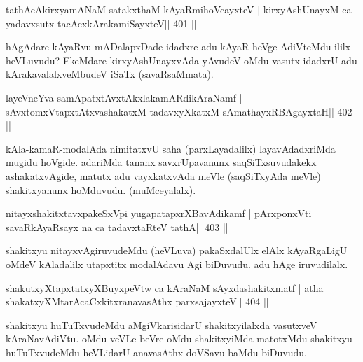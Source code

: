 
\begin{shl}
tathAcAkirxyamANaM satakxthaM kAyaRmihoVcayxteV |
kirxyAshUnayxM ca yadavxsutx tacAcxkArakamiSayxteV\hfill || 401 ||
\end{shl}

\begin{artha}
hAgAdare kAyaRvu mADalapxDade idadxre adu kAyaR heVge AdiVteMdu ililx heVLuvudu? EkeMdare kirxyAshUnayxvAda yAvudeV oMdu vasutx idadxrU adu kArakavalalxveMbudeV iSaTx (savaRsaMmata).
\end{artha}


\begin{shl}
layeVneYva samApatxtAvxtAkxlakamARdikAraNamf |
sAvxtomxVtapxtAtxvashakatxM tadavxyXkatxM sAmathayxRBAgayxtaH\hfill || 402 ||
\end{shl}

\begin{artha}
kAla-kamaR-modalAda nimitatxvU saha (parxLayadalilx) layavAdadxriMda  mugidu hoVgide. adariMda tananx savxrUpavanunx saqSiTxsuvudakekx ashakatxvAgide, matutx adu vayxkatxvAda meVle (saqSiTxyAda meVle) shakitxyanunx hoMduvudu. (muMceyalalx).
\end{artha}

\begin{shl}
nitayxshakitxtavxpakeSxV\s pi yugapatapxrXBavAdikamf |
pArxponxVti savaRkAyaRsayx na ca tadavxtaRteV tathA\hfill || 403 ||
\end{shl}

\begin{artha}
shakitxyu nitayxvAgiruvudeMdu (heVLuva) pakaSxdalUlx elAlx kAyaRgaLigU  oMdeV kAladalilx utapxtitx modalAdavu Agi biDuvudu. adu hAge iruvudilalx.
\end{artha}

\begin{shl}
shakutxyXtapxtatxyXBuyxpeVtw ca kAraNaM sAyxdashakitxmatf |
atha shakatxyXMtarAcaCxkitxranavasAthx parxsajayxteV\hfill || 404 ||
\end{shl}

\begin{artha}
shakitxyu huTuTxvudeMdu aMgiVkarisidarU shakitxyilalxda vasutxveV 
kAraNavAdiVtu. oMdu veVLe beVre oMdu shakitxyiMda matotxMdu shakitxyu 
huTuTxvudeMdu heVLidarU anavasAthx doVSavu baMdu biDuvudu.
\end{artha}

